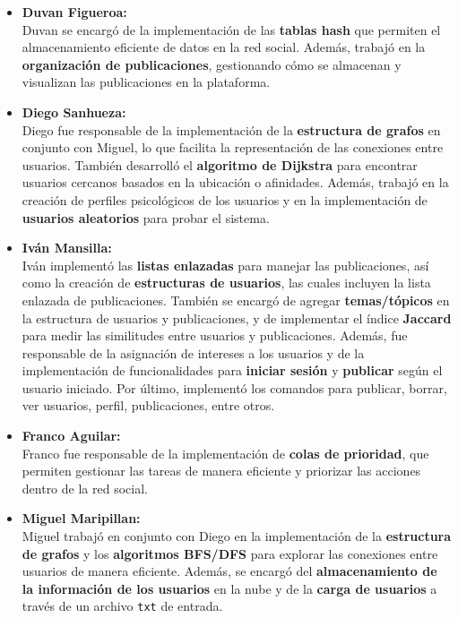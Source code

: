 \documentclass[9pt,letterpaper,onecolumn]{rho-class/rho}
\begin{document}
    \begin{itemize}
        \item \textbf{Duvan Figueroa:} \\
        Duvan se encargó de la implementación de las \textbf{tablas hash} que permiten el almacenamiento eficiente de datos en la red social. Además, trabajó en la \textbf{organización de publicaciones}, gestionando cómo se almacenan y visualizan las publicaciones en la plataforma.
    
        \item \textbf{Diego Sanhueza:} \\
        Diego fue responsable de la implementación de la \textbf{estructura de grafos} en conjunto con Miguel, lo que facilita la representación de las conexiones entre usuarios. También desarrolló el \textbf{algoritmo de Dijkstra} para encontrar usuarios cercanos basados en la ubicación o afinidades. Además, trabajó en la creación de perfiles psicológicos de los usuarios y en la implementación de \textbf{usuarios aleatorios} para probar el sistema.
    
        \item \textbf{Iván Mansilla:} \\
        Iván implementó las \textbf{listas enlazadas} para manejar las publicaciones, así como la creación de \textbf{estructuras de usuarios}, las cuales incluyen la lista enlazada de publicaciones. También se encargó de agregar \textbf{temas/tópicos} en la estructura de usuarios y publicaciones, y de implementar el índice \textbf{Jaccard} para medir las similitudes entre usuarios y publicaciones. Además, fue responsable de la asignación de intereses a los usuarios y de la implementación de funcionalidades para \textbf{iniciar sesión} y \textbf{publicar} según el usuario iniciado. Por último, implementó los comandos para publicar, borrar, ver usuarios, perfil, publicaciones, entre otros.
    
        \item \textbf{Franco Aguilar:} \\
        Franco fue responsable de la implementación de \textbf{colas de prioridad}, que permiten gestionar las tareas de manera eficiente y priorizar las acciones dentro de la red social.
    
        \item \textbf{Miguel Maripillan:} \\
        Miguel trabajó en conjunto con Diego en la implementación de la \textbf{estructura de grafos} y los \textbf{algoritmos BFS/DFS} para explorar las conexiones entre usuarios de manera eficiente. Además, se encargó del \textbf{almacenamiento de la información de los usuarios} en la nube y de la \textbf{carga de usuarios} a través de un archivo \texttt{txt} de entrada.
    \end{itemize}
\end{document}
